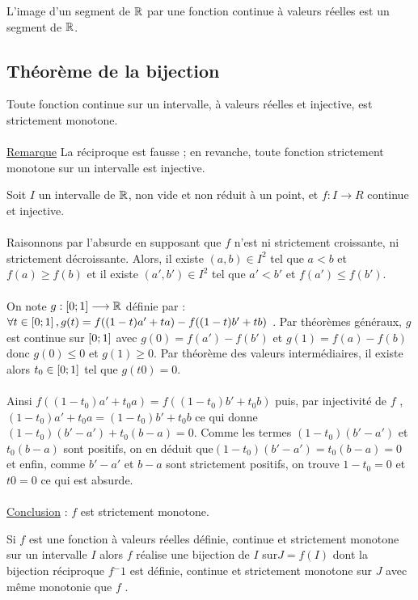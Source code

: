 \begin{defprop}
    L’image d’un segment de \(\mathbb{R}\) par une fonction continue à valeurs réelles est un segment de \(\mathbb{R}\).
\end{defprop}

\subsection{Théorème de la bijection}
\begin{defprop}
    Toute fonction continue sur un intervalle, à valeurs réelles et injective, est strictement monotone.\\~\\
\underline{Remarque}
    La réciproque est fausse ; en revanche, toute fonction strictement monotone sur un intervalle est injective.
\end{defprop}

\begin{dem}
    Soit \(I\) un intervalle de \(\mathbb{R}\), non vide et non réduit à un point, et \(f : I \to R\) continue et injective.\\~\\
    Raisonnons par l’absurde en supposant que \(f\) n’est ni strictement croissante, ni strictement décroissante. Alors,
    il existe \((a, b) \in I^2\) tel que \(a < b\) et \(f (a) \geq f (b)\) et il existe \((a', b') \in I^2\) tel que \(a' < b'\) et \(f (a') \leq f (b')\).\\~\\
    On note \(g : \left[0;1\right] \longrightarrow \mathbb{R}\) définie par : \(\forall t \in \left[0;1\right], g(t) = f ((1 - t)a' + ta) - f ((1 - t)b' + tb)\) . Par théorèmes généraux, \(g\) est continue sur \(\left[0;1\right]\) avec \(g(0) = f (a') - f (b')\) et \(g(1) = f (a) - f (b)\) donc \(g(0) \leq 0 \) et \(g(1) \geq 0\). Par théorème des valeurs intermédiaires, il existe alors \(t_0 \in \left[0;1\right]\) tel que \(g(t0) = 0\).\\~\\
    Ainsi \(f ((1 - t_0)a' + t_0a) = f ((1 - t_0)b' + t_0b)\) puis, par injectivité de \(f\) , \((1 - t_0)a' + t_0a = (1 - t_0)b' + t_0b\) ce qui donne \((1 - t_0)(b' - a') + t_0(b - a) = 0\). Comme les termes \((1 - t_0)(b' - a')\) et \(t_0(b - a)\) sont positifs, on en déduit que\( (1 - t_0)(b' - a') = t_0(b - a) = 0\) et enfin, comme \( b' - a'\) et \(b - a\) sont strictement positifs, on trouve \(1 - t_0 = 0\) et \( t0 = 0\) ce qui est absurde.\\~\\
    \underline{Conclusion} : \(f\) est strictement monotone.
\end{dem}
\begin{theo}
Si \(f\) est une fonction à valeurs réelles définie, continue et strictement monotone sur un intervalle \(I\) alors \(f\) réalise une bijection de \(I\) sur\( J = f (I)\) dont la bijection réciproque \(f {^-1}\) est définie, continue et strictement monotone sur \(J\) avec même monotonie que \(f\) .
\end{theo}

